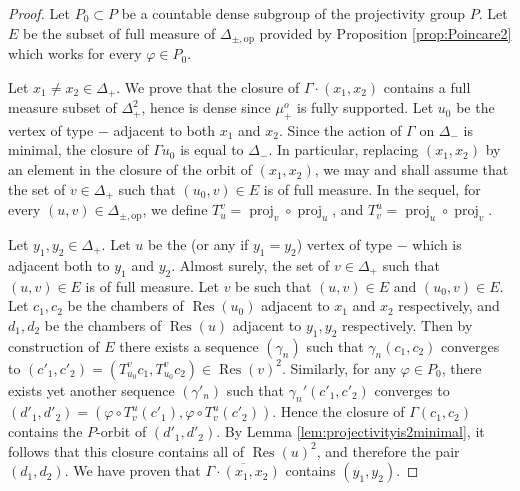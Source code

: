\documentclass[a4paper, 11pt]{article}
\theoremstyle{plain}
\theoremstyle{definition}
\theoremstyle{remark}
\DeclareMathOperator{\proj}{proj}
\DeclareMathOperator{\Res}{Res}
\newcommand{\pmop}{ {\pm,\mathrm{op}}}
\begin{document}
\begin{proof}

Let $P_0\subset P$ be a countable dense subgroup of the projectivity group $P$. Let $E$ be the subset of full measure of $\Delta_\pmop$ provided by Proposition \ref{prop:Poincare2} which works for every $\varphi\in P_0$.


Let $x_1\neq x_2\in\Delta_+$.  We prove that the closure of $\Gamma\cdot (x_1,x_2)$ contains a full measure subset of $\Delta_+^2$, hence is dense since $\mu_+^o$ is fully supported. Let $u_0$ be the vertex of type $-$ adjacent to both $x_1$ and $x_2$. Since the action of $\Gamma$ on $\Delta_-$ is minimal, the closure of $\Gamma u_0$ is equal to $\Delta_-$. In particular, replacing $(x_1,x_2)$ by an element in the closure of the orbit of $(x_1,x_2)$, we may and shall assume that the set of $v\in \Delta_+$ such that $(u_0,v)\in E$ is of full measure. In the sequel, for every $(u,v)\in \Delta_\pmop$, we define $T_u^v=\proj_v\circ \proj_u$, and $T_v^u = \proj_u\circ \proj_v$.\index{$T_u^v$\hfill $\proj_v\circ\proj_u$|bb}


 Let $y_1,y_2\in\Delta_+$. Let $u$ be the (or any if $y_1=y_2$) vertex of type $-$ which is adjacent both to $y_1$ and $y_2$. Almost surely, the set of $v\in \Delta_+$ such that $(u,v)\in E$ is of full measure. Let $v$ be such that $(u,v)\in E$ and $(u_0,v)\in E$. Let $c_1,c_2$ be the chambers of $\Res(u_0)$ adjacent to $x_1$ and $x_2$ respectively, and $d_1,d_2$ be the chambers of $\Res(u)$ adjacent to $y_1,y_2$ respectively. 
 Then by construction of $E$ there exists a sequence $(\gamma_n)$ such that $\gamma_n(c_1,c_2)$ converges to $(c'_1,c'_2)=(T_{u_0}^v c_1,T_{u_0}^v c_2)\in \Res(v)^2$. Similarly, for any $\varphi \in P_0$, there exists yet another sequence $(\gamma'_n)$ such that $\gamma_n'(c'_1,c'_2)$ converges to  $(d'_1,d'_2)=(\varphi\circ T_v^u (c'_1),\varphi\circ T_v^u (c'_2))$. Hence the closure of $\Gamma (c_1,c_2)$ contains the $P$-orbit of $(d'_1,d'_2)$. By Lemma \ref{lem:projectivityis2minimal}, it follows that this closure contains all of $\Res(u)^2$, and therefore the pair $(d_1,d_2)$. We have proven that $\overline{ \Gamma\cdot (x_1,x_2)}$ contains $(y_1,y_2)$.
 

\end{proof}
\end{document}
